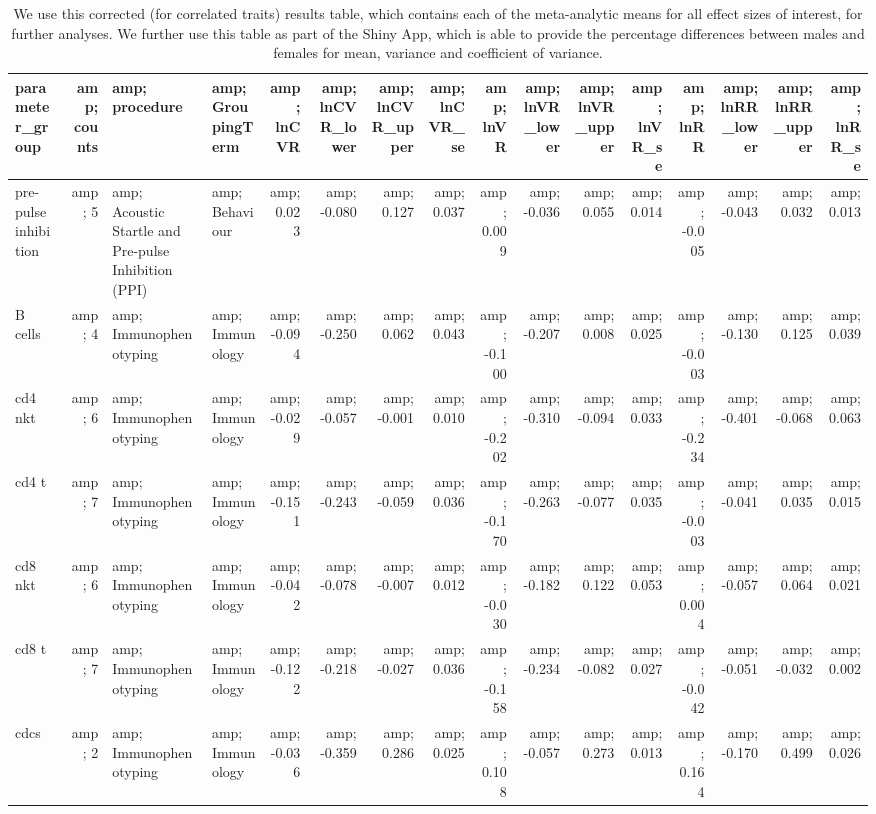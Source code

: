 \documentclass[]{article}
\begin{document}
\begin{table}

\caption{\label{tab:Table3}We use this corrected (for correlated traits) results table, which contains each of the meta-analytic means for all effect sizes of interest, for further analyses.  We further use this table as part of the Shiny App, which is able to provide the percentage differences between males and females for mean, variance and coefficient of variance.}
\centering
\begin{tabular}[t]{l|r|l|l|r|r|r|r|r|r|r|r|r|r|r|r}
\hline
parameter\_group &amp; counts &amp; procedure &amp; GroupingTerm &amp; lnCVR &amp; lnCVR\_lower &amp; lnCVR\_upper &amp; lnCVR\_se &amp; lnVR &amp; lnVR\_lower &amp; lnVR\_upper &amp; lnVR\_se &amp; lnRR &amp; lnRR\_lower &amp; lnRR\_upper &amp; lnRR\_se\\
\hline
pre-pulse inhibition &amp; 5 &amp; Acoustic Startle and Pre-pulse Inhibition (PPI) &amp; Behaviour &amp; 0.023 &amp; -0.080 &amp; 0.127 &amp; 0.037 &amp; 0.009 &amp; -0.036 &amp; 0.055 &amp; 0.014 &amp; -0.005 &amp; -0.043 &amp; 0.032 &amp; 0.013\\
\hline
B cells &amp; 4 &amp; Immunophenotyping &amp; Immunology &amp; -0.094 &amp; -0.250 &amp; 0.062 &amp; 0.043 &amp; -0.100 &amp; -0.207 &amp; 0.008 &amp; 0.025 &amp; -0.003 &amp; -0.130 &amp; 0.125 &amp; 0.039\\
\hline
cd4 nkt &amp; 6 &amp; Immunophenotyping &amp; Immunology &amp; -0.029 &amp; -0.057 &amp; -0.001 &amp; 0.010 &amp; -0.202 &amp; -0.310 &amp; -0.094 &amp; 0.033 &amp; -0.234 &amp; -0.401 &amp; -0.068 &amp; 0.063\\
\hline
cd4 t &amp; 7 &amp; Immunophenotyping &amp; Immunology &amp; -0.151 &amp; -0.243 &amp; -0.059 &amp; 0.036 &amp; -0.170 &amp; -0.263 &amp; -0.077 &amp; 0.035 &amp; -0.003 &amp; -0.041 &amp; 0.035 &amp; 0.015\\
\hline
cd8 nkt &amp; 6 &amp; Immunophenotyping &amp; Immunology &amp; -0.042 &amp; -0.078 &amp; -0.007 &amp; 0.012 &amp; -0.030 &amp; -0.182 &amp; 0.122 &amp; 0.053 &amp; 0.004 &amp; -0.057 &amp; 0.064 &amp; 0.021\\
\hline
cd8 t &amp; 7 &amp; Immunophenotyping &amp; Immunology &amp; -0.122 &amp; -0.218 &amp; -0.027 &amp; 0.036 &amp; -0.158 &amp; -0.234 &amp; -0.082 &amp; 0.027 &amp; -0.042 &amp; -0.051 &amp; -0.032 &amp; 0.002\\
\hline
cdcs &amp; 2 &amp; Immunophenotyping &amp; Immunology &amp; -0.036 &amp; -0.359 &amp; 0.286 &amp; 0.025 &amp; 0.108 &amp; -0.057 &amp; 0.273 &amp; 0.013 &amp; 0.164 &amp; -0.170 &amp; 0.499 &amp; 0.026\\

\end{tabular}
\end{table}
\end{document}
